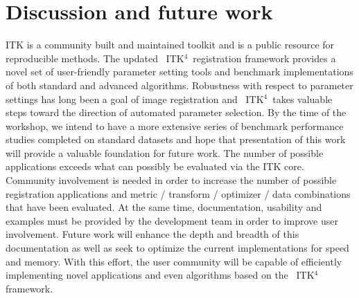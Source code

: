 \documentclass{llncs}
\newcommand{\tk}{~ITK$^{\text{4}}$~}
\begin{document}
\section{Discussion and future work} 
ITK is a community built and maintained toolkit and is a public
resource for reproducible methods.  The updated \tk registration
framework provides a novel set of user-friendly parameter setting
tools and benchmark implementations of both standard and advanced
algorithms.  Robustness with respect to parameter settings has long
been a goal of image registration and \tk takes valuable steps toward
the direction of automated parameter selection.  By the time of the
workshop, we intend to have a more extensive series of benchmark performance studies
completed on standard datasets and hope that presentation of this work
will provide a valuable foundation for future work.  The number of
possible applications exceeds what can possibly be evaluated via the
ITK core.  Community involvement is needed in order to increase the
number of possible registration applications and metric / transform /
optimizer / data combinations that have been evaluated.  At the same
time, documentation, usability and examples must be provided by the
development team in order to improve user involvement.  Future work
will enhance the depth and breadth of this documentation as well as
seek to optimize the current implementations for speed and memory.
With this effort, the user community will be capable of efficiently
implementing novel applications and even algorithms based on the \tk
framework.
\end{document}

